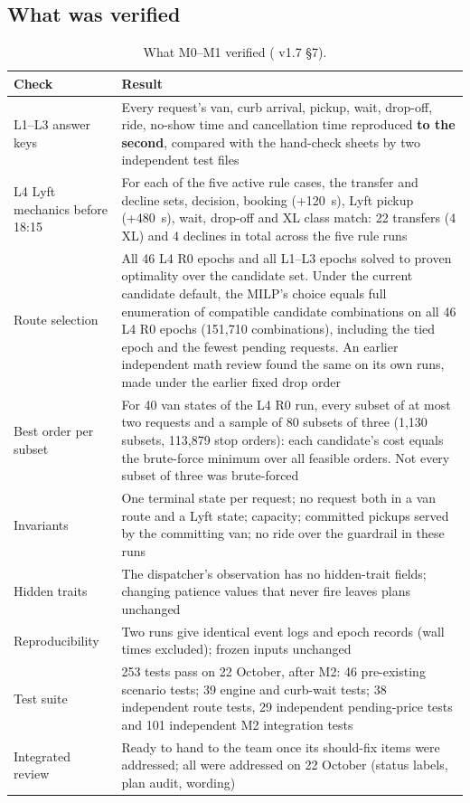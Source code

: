 \documentclass[11pt,letterpaper]{article}
\DeclareRobustCommand{\fn}[1]{\texttt{\detokenize{#1}}}
\begin{document}
\subsection{What was verified}
\begin{table}[H]
\centering\small
\caption[What M0--M1 verified]{What M0--M1 verified (\fn{scenario_methodology.md} v1.7 §7).}\label{tab:verified}
\begin{tabularx}{\textwidth}{@{}P{3.2cm}L@{}}
\toprule
\textbf{Check} & \textbf{Result}\\
\midrule
L1--L3 answer keys & Every request's van, curb arrival, pickup, wait, drop-off, ride, no-show time and cancellation time reproduced \textbf{to the second}, compared with the hand-check sheets by two independent test files\\
L4 Lyft mechanics before 18:15 & For each of the five active rule cases, the transfer and decline sets, decision, booking (+120~s), Lyft pickup (+480~s), wait, drop-off and XL class match: 22 transfers (4 XL) and 4 declines in total across the five rule runs\\
Route selection & All 46 L4 R0 epochs and all L1--L3 epochs solved to proven optimality over the candidate set. Under the current candidate default, the MILP's choice equals full enumeration of compatible candidate combinations on all 46 L4 R0 epochs (151,710 combinations), including the tied epoch and the fewest pending requests. An earlier independent math review found the same on its own runs, made under the earlier fixed drop order\\
Best order per subset & For 40 van states of the L4 R0 run, every subset of at most two requests and a sample of 80 subsets of three (1,130 subsets, 113,879 stop orders): each candidate's cost equals the brute-force minimum over all feasible orders. Not every subset of three was brute-forced\\
Invariants & One terminal state per request; no request both in a van route and a Lyft state; capacity; committed pickups served by the committing van; no ride over the guardrail in these runs\\
Hidden traits & The dispatcher's observation has no hidden-trait fields; changing patience values that never fire leaves plans unchanged\\
Reproducibility & Two runs give identical event logs and epoch records (wall times excluded); frozen inputs unchanged\\
Test suite & 253 tests pass on 22 October, after M2: 46 pre-existing scenario tests; 39 engine and curb-wait tests; 38 independent route tests, 29 independent pending-price tests and 101 independent M2 integration tests\\
Integrated review & Ready to hand to the team once its should-fix items were addressed; all were addressed on 22 October (status labels, plan audit, wording)\\
\bottomrule
\end{tabularx}
\end{table}
\end{document}
